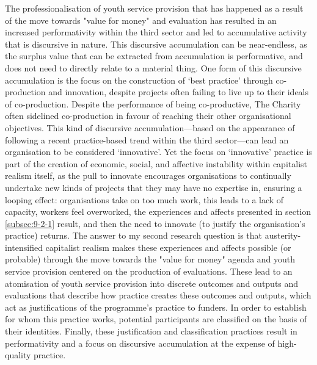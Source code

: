 The professionalisation of youth service provision that has happened as a result of the move towards "value for money" and evaluation has resulted in an increased performativity within the third sector and led to accumulative activity that is discursive in nature. This discursive accumulation can be near-endless, as the surplus value that can be extracted from accumulation is performative, and does not need to directly relate to a material thing. One form of this discursive accumulation is the focus on the construction of `best practice' through co-production and innovation, despite projects often failing to live up to their ideals of co-production. Despite the performance of being co-productive, The Charity often sidelined co-production in favour of reaching their other organisational objectives. This kind of discursive accumulation—based on the appearance of following a recent practice-based trend within the third sector—can lead an organisation to be considered `innovative'. Yet the focus on `innovative' practice is part of the creation of economic, social, and affective instability within capitalist realism itself, as the pull to innovate encourages organisations to continually undertake new kinds of projects that they may have no expertise in, ensuring a looping effect: organisations take on too much work, this leads to a lack of capacity, workers feel overworked, the experiences and affects presented in section \ref{subsec:9-2-1} result, and then the need to innovate (to justify the organisation's practice) returns.  The answer to my second research question is that austerity-intensified capitalist realism makes these experiences and affects possible (or probable) through the move towards the "value for money" agenda and youth service provision centered on the production of evaluations. These lead to an atomisation of youth service provision into discrete outcomes and outputs and evaluations that describe how practice creates these outcomes and outputs, which act as justifications of the programme's practice to funders. In order to establish for whom this practice works, potential participants are classified on the basis of their identities. Finally, these justification and classification practices result in performativity and a focus on discursive accumulation at the expense of high-quality practice. 

